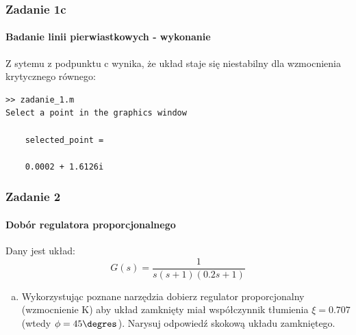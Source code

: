 \documentclass{beamer}
\begin{document}
\begin{frame}[fragile]\frametitle{Zadanie 1c}\framesubtitle{Badanie linii pierwiastkowych - wykonanie}
	
Z sytemu z podpunktu c wynika, że układ staje się niestabilny dla wzmocnienia krytycznego równego:
	
\begin{lstlisting}
>> zadanie_1.m
Select a point in the graphics window
	
	selected_point =
	
	0.0002 + 1.6126i

\end{lstlisting}	
\end{frame}



\begin{frame}\frametitle{Zadanie 2}\framesubtitle{Dobór regulatora proporcjonalnego}
	Dany jest układ:
	\[
	G(s) = \frac{1}{s(s+1)(0.2s+1)}
	\]
    \begin{enumerate}[a)]
        \item Wykorzystując poznane narzędzia dobierz regulator proporcjonalny (wzmocnienie K) aby układ zamknięty miał współczynnik tłumienia $\xi = 0.707$ (wtedy $\phi = 45\degres$). Narysuj odpowiedź skokową układu zamkniętego.
        
        
    \end{enumerate}
\end{frame}
\end{document}
